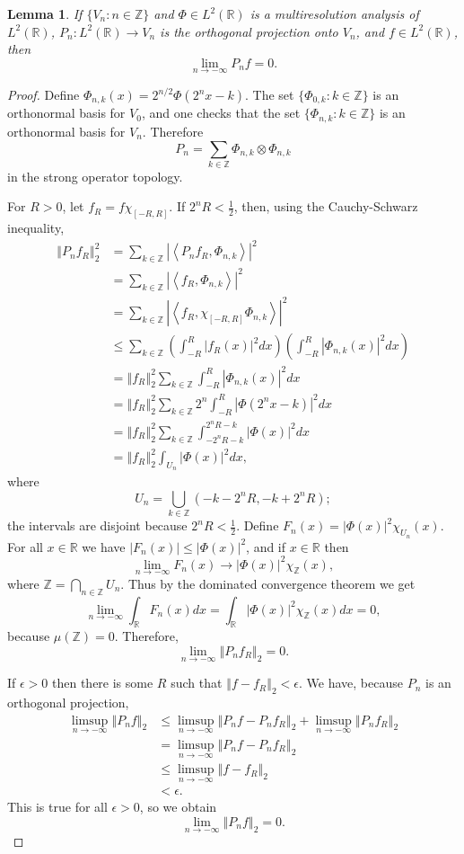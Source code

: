 \documentclass{article}
\newcommand{\inner}[2]{\left\langle #1, #2 \right\rangle}
\newcommand{\norm}[1]{\left\Vert #1 \right\Vert}
\newtheorem{lemma}[theorem]{Lemma}
\theoremstyle{definition}
\begin{document}
\begin{lemma}
If $\{V_n:n \in \mathbb{Z}\}$ and $\Phi \in L^2(\mathbb{R})$ is a multiresolution analysis of $L^2(\mathbb{R})$,
$P_n:L^2(\mathbb{R}) \to V_n$ is the orthogonal projection onto $V_n$, and $f \in L^2(\mathbb{R})$, then
\[
\lim_{n \to -\infty} P_nf=0.
\]
\label{MRAprojections}
\end{lemma}
\begin{proof}
Define $\Phi_{n,k}(x)=2^{n/2} \Phi(2^nx-k)$.
The set $\{\Phi_{0,k}: k \in \mathbb{Z}\}$ is an orthonormal basis for $V_0$, and one checks that the set $\{\Phi_{n,k}: k \in \mathbb{Z}\}$ is an orthonormal
basis for $V_n$. Therefore
\[
P_n = \sum_{k \in \mathbb{Z}} \Phi_{n,k} \otimes \Phi_{n,k}
\]
in the strong operator topology.

For $R>0$, let $f_R= f\chi_{[-R,R]}$. If $2^nR<\frac{1}{2}$, then, using the Cauchy-Schwarz inequality,
\begin{align*}
\norm{P_nf_R}_2^2&=\sum_{k \in \mathbb{Z}} |\inner{P_nf_R}{\Phi_{n,k}}|^2\\
&=\sum_{k \in \mathbb{Z}} |\inner{f_R}{\Phi_{n,k}}|^2\\
&=\sum_{k \in \mathbb{Z}} |\inner{f_R}{\chi_{[-R,R]} \Phi_{n,k}}|^2\\
&\leq \sum_{k \in \mathbb{Z}} \left( \int_{-R}^R |f_R(x)|^2 dx \right) \left( \int_{-R}^R |\Phi_{n,k}(x)|^2 dx \right)\\
&=\norm{f_R}_2^2 \sum_{k \in \mathbb{Z}}  \int_{-R}^R |\Phi_{n,k}(x)|^2 dx\\
&=\norm{f_R}_2^2 \sum_{k \in \mathbb{Z}} 2^n \int_{-R}^R |\Phi(2^nx-k)|^2 dx\\
&=\norm{f_R}_2^2 \sum_{k \in \mathbb{Z}}  \int_{-2^n R-k}^{2^nR-k} |\Phi(x)|^2 dx\\
&=\norm{f_R}_2^2 \int_{U_n} |\Phi(x)|^2 dx,
\end{align*}
where
\[
U_n = \bigcup_{k \in \mathbb{Z}} (-k-2^nR,-k+2^nR);
\]
the intervals are disjoint because $2^nR<\frac{1}{2}$. Define $F_n(x)=|\Phi(x)|^2 \chi_{U_n}(x)$. For all $x \in \mathbb{R}$
we have $|F_n(x)| \leq |\Phi(x)|^2$, and if $x \in \mathbb{R}$ then
\[
\lim_{n \to -\infty} F_n(x) \to |\Phi(x)|^2 \chi_{\mathbb{Z}}(x),
\]
where $\mathbb{Z}=\bigcap_{n \in \mathbb{Z}} U_n$. Thus by the dominated convergence theorem we get
\[
\lim_{n \to -\infty} \int_\mathbb{R} F_n(x) dx = \int_\mathbb{R} |\Phi(x)|^2 \chi_{\mathbb{Z}}(x) dx = 0,
\]
because $\mu(\mathbb{Z})=0$. Therefore,
\[
\lim_{n \to -\infty} \norm{P_n f_R}_2 =0.
\]

If $\epsilon>0$ then there is some $R$ such that $\norm{f-f_R}_2<\epsilon$. We have, because $P_n$ is an orthogonal projection,
\begin{align*}
\limsup_{n \to -\infty} \norm{P_n f}_2 &\leq \limsup_{n \to -\infty} \norm{P_nf -P_nf_R}_2 + \limsup_{n \to -\infty} \norm{P_nf_R}_2\\
&= \limsup_{n \to -\infty} \norm{P_n f- P_nf_R}_2\\
&\leq \limsup_{n \to -\infty} \norm{f-f_R}_2\\
&<\epsilon.
\end{align*}
This is true for all $\epsilon>0$, so we obtain
\[
\lim_{n \to -\infty} \norm{P_nf}_2 =0.
\]


\end{proof}
\end{document}
